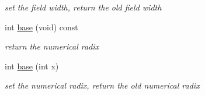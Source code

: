 \begin{DoxyCompactItemize}
\begin{DoxyCompactList}\small\item\em set the field width, return the old field width \end{DoxyCompactList}\item 
int \hyperlink{classhwlib_1_1ostream_a6266f7f74a244b69c33d4c6d9be6c145}{base} (void) const \hypertarget{classhwlib_1_1ostream_a6266f7f74a244b69c33d4c6d9be6c145}{}\label{classhwlib_1_1ostream_a6266f7f74a244b69c33d4c6d9be6c145}

\begin{DoxyCompactList}\small\item\em return the numerical radix \end{DoxyCompactList}\item 
int \hyperlink{classhwlib_1_1ostream_a0895d45a31d89352d5c167dc0932399b}{base} (int x)\hypertarget{classhwlib_1_1ostream_a0895d45a31d89352d5c167dc0932399b}{}\label{classhwlib_1_1ostream_a0895d45a31d89352d5c167dc0932399b}

\begin{DoxyCompactList}\small\item\em set the numerical radix, return the old numerical radix \end{DoxyCompactList}\end{DoxyCompactItemize}
